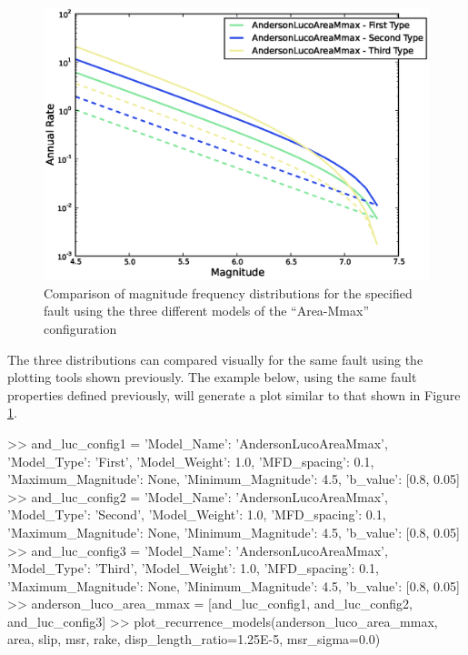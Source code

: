 \begin{figure}[htb]
  \centering
      \includegraphics[trim=5mm 5mm 5mm 5mm, clip, width=12cm]{./figures/anderson_luco_mmax_mfds.eps}
  \caption{Comparison of magnitude frequency distributions for the specified fault using the three different models of the \textcite{AndersonLuco1983} ``Area-Mmax'' configuration}
  \label{fig:anderson_luco_area_mmax}
\end{figure}

The three distributions can compared visually for the same fault using the plotting tools shown previously. The example below, using the same fault properties defined previously, will generate a plot similar to that shown in Figure \ref{fig:anderson_luco_area_mmax}.

\begin{python}[frame=single]
>> and_luc_config1 = {'Model_Name': 'AndersonLucoAreaMmax',
                      'Model_Type': 'First',
                      'Model_Weight': 1.0,  
                      'MFD_spacing': 0.1,
                      'Maximum_Magnitude': None,
                      'Minimum_Magnitude': 4.5,
                      'b_value': [0.8, 0.05]}
>> and_luc_config2 = {'Model_Name': 'AndersonLucoAreaMmax',
                      'Model_Type': 'Second',
                      'Model_Weight': 1.0,
                      'MFD_spacing': 0.1,
                      'Maximum_Magnitude': None,
                      'Minimum_Magnitude': 4.5,
                      'b_value': [0.8, 0.05]}
>> and_luc_config3 = {'Model_Name': 'AndersonLucoAreaMmax',
                      'Model_Type': 'Third',
                      'Model_Weight': 1.0,   
                      'MFD_spacing': 0.1,
                      'Maximum_Magnitude': None,
                      'Minimum_Magnitude': 4.5,
                      'b_value': [0.8, 0.05]}
>> anderson_luco_area_mmax = [and_luc_config1,
                              and_luc_config2,
                              and_luc_config3]
>> plot_recurrence_models(anderson_luco_area_mmax,
                          area,
                          slip,
                          msr,
                          rake,
                          disp_length_ratio=1.25E-5, 
                          msr_sigma=0.0)

\end{python}

